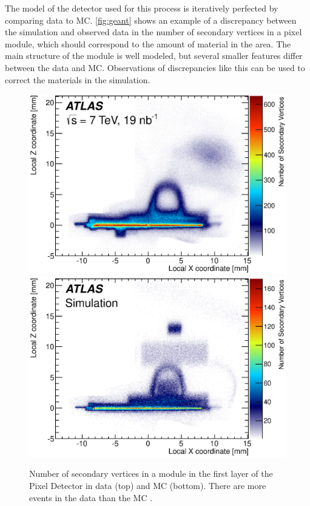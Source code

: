 The model of the detector used for this process is iteratively perfected by comparing data to \ac{MC}. \autoref{fig:geant} shows an example of a discrepancy between the simulation and observed data in the number of secondary vertices in a pixel module, which should correspond to the amount of material in the area. The main structure of the module is well modeled, but several smaller features differ between the data and \ac{MC}. Observations of discrepancies like this can be used to correct the materials in the simulation. 

\begin{centering}
\begin{figure}[!hbt]
\myfloatalign
\includegraphics[width=.9\linewidth]{figures/theory/fig_10a.eps}
\includegraphics[width=.9\linewidth]{figures/theory/fig_10b.eps}
\caption{Number of secondary vertices in a module in the first layer of the Pixel Detector in data (top) and \ac{MC} (bottom). There are more events in the data than the \ac{MC} \cite{PERF-2015-06}.}
\label{fig:geant}
\end{figure}
\end{centering}

